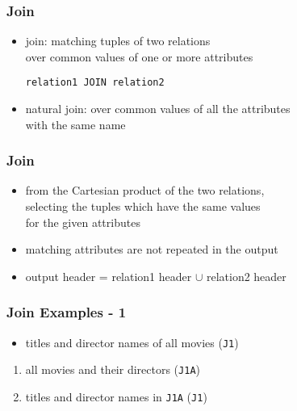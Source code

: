 \documentclass[dvipsnames]{beamer}
\theoremstyle{plain}
\begin{document}
\begin{frame}[fragile]
  \frametitle{Join}

  \begin{itemize}
    \item \alert{join}: matching tuples of two relations\\
      over common values of one or more attributes
    \begin{lstlisting}
relation1 JOIN relation2
    \end{lstlisting}

    \pause
    \medskip
    \item \alert{natural join}: over common values of all the attributes\\
      with the same name
  \end{itemize}
\end{frame}

\begin{frame}
  \frametitle{Join}

  \begin{itemize}
    \item from the Cartesian product of the two relations,\\
      selecting the tuples which have the same values\\
      for the given attributes
    \item matching attributes are not repeated in the output

    \medskip
    \item output header = relation1 header $\cup$ relation2 header
  \end{itemize}
\end{frame}

\begin{frame}
  \frametitle{Join Examples - 1}

  \begin{itemize}
    \item titles and director names of all movies
      (\texttt{J1})
  \end{itemize}

  \pause
  \begin{enumerate}
    \item all movies and their directors (\texttt{J1A})

    \pause
    \item titles and director names in \texttt{J1A} (\texttt{J1})
  \end{enumerate}
\end{frame}
\end{document}
